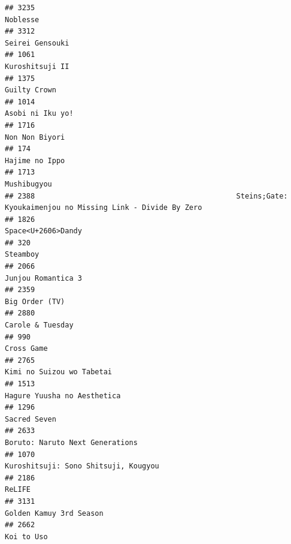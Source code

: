 \documentclass[
]{article}
\begin{document}
\begin{verbatim}
## 3235                                                                                                  Noblesse
## 3312                                                                                           Seirei Gensouki
## 1061                                                                                           Kuroshitsuji II
## 1375                                                                                              Guilty Crown
## 1014                                                                                          Asobi ni Iku yo!
## 1716                                                                                            Non Non Biyori
## 174                                                                                             Hajime no Ippo
## 1713                                                                                               Mushibugyou
## 2388                                               Steins;Gate: Kyoukaimenjou no Missing Link - Divide By Zero
## 1826                                                                                        Space<U+2606>Dandy
## 320                                                                                                   Steamboy
## 2066                                                                                        Junjou Romantica 3
## 2359                                                                                            Big Order (TV)
## 2880                                                                                          Carole & Tuesday
## 990                                                                                                 Cross Game
## 2765                                                                                 Kimi no Suizou wo Tabetai
## 1513                                                                               Hagure Yuusha no Aesthetica
## 1296                                                                                              Sacred Seven
## 2633                                                                           Boruto: Naruto Next Generations
## 1070                                                                      Kuroshitsuji: Sono Shitsuji, Kougyou
## 2186                                                                                                    ReLIFE
## 3131                                                                                   Golden Kamuy 3rd Season
## 2662                                                                                                Koi to Uso

\end{verbatim}
\end{document}
